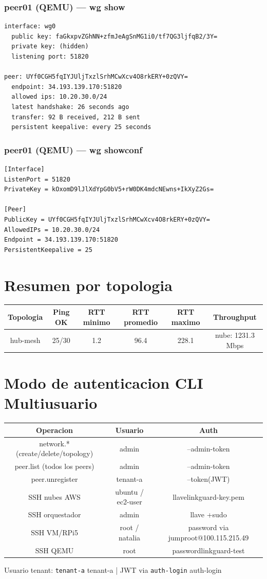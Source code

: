 \documentclass[11pt,a4paper]{article}
\begin{document}
\subsubsection*{peer01 (QEMU) — wg show}
\begin{lstlisting}
interface: wg0
  public key: faGkxpvZGhNN+zfmJeAgSnMG1i0/tf7QG3ljfqB2/3Y=
  private key: (hidden)
  listening port: 51820

peer: UYf0CGH5fqIYJUljTxzlSrhMCwXcv4O8rkERY+0zQVY=
  endpoint: 34.193.139.170:51820
  allowed ips: 10.20.30.0/24
  latest handshake: 26 seconds ago
  transfer: 92 B received, 212 B sent
  persistent keepalive: every 25 seconds

\end{lstlisting}

\subsubsection*{peer01 (QEMU) — wg showconf}
\begin{lstlisting}
[Interface]
ListenPort = 51820
PrivateKey = kOxomD9lJlXdYpG0bV5+rW0DK4mdcNEwns+IkXyZ2Gs=

[Peer]
PublicKey = UYf0CGH5fqIYJUljTxzlSrhMCwXcv4O8rkERY+0zQVY=
AllowedIPs = 10.20.30.0/24
Endpoint = 34.193.139.170:51820
PersistentKeepalive = 25

\end{lstlisting}

\section{Resumen por topologia}
\begin{longtable}{|c|c|c|c|c|c|}
\hline
Topologia & Ping OK & RTT minimo & RTT promedio & RTT maximo & Throughput \\ \hline
hub-mesh & 25/30 & 1.2 & 96.4 & 228.1 & nube: 1231.3 Mbps \\ \hline
\end{longtable}

\section{Modo de autenticacion CLI Multiusuario}
\begin{longtable}{|c|c|c|}
\hline
Operacion & Usuario & Auth \\ \hline
network.* (create/delete/topology) & admin & --admin-token \\ \hline
peer.list (todos los peers) & admin & --admin-token \\ \hline
peer.unregister & tenant-a & --token(JWT) \\ \hline
SSH nubes AWS & ubuntu / ec2-user & llavelinkguard-key.pem \\ \hline
SSH orquestador & admin & llave +sudo \\ \hline
SSH VM/RPi5 & root / natalia & password via jumproot@100.115.215.49 \\ \hline
SSH QEMU & root & passwordlinkguard-test \\ \hline
\end{longtable}

Usuario tenant:  \texttt{tenant-a} tenant-a  | JWT via  \texttt{auth-login} auth-login\\
\end{document}
